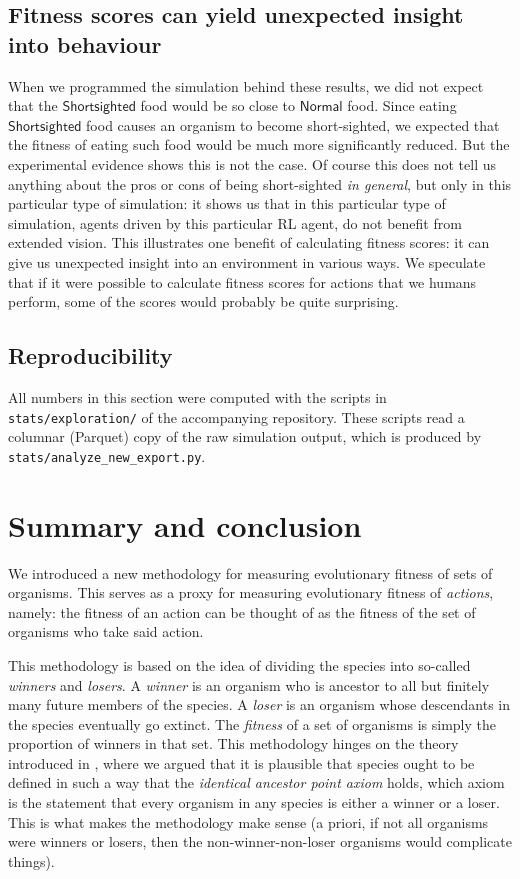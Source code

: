 \documentclass{article}
\begin{document}
\subsection{Fitness scores can yield unexpected insight into behaviour}

When we programmed the simulation behind these results, we did not expect
that the $\mathsf{Shortsighted}$ food would be so close to $\mathsf{Normal}$ food.
Since eating $\mathsf{Shortsighted}$ food causes an organism to
become short-sighted,
we expected that the fitness of eating such food would be much more significantly
reduced. But the experimental evidence shows this is not the case.
Of course this does not tell us anything about the pros or cons of being
short-sighted \emph{in general}, but only in this particular type of simulation:
it shows us that in this particular type of simulation, agents driven by this
particular RL agent, do not benefit from extended vision.
This
illustrates one benefit of calculating fitness scores: it can give us unexpected
insight into an environment in various ways. We speculate that if it were
possible to calculate fitness scores for actions that we humans perform,
some of the scores would probably be quite surprising.

\subsection{Reproducibility}

All numbers in this section were computed with the scripts in
\texttt{stats/exploration/} of the accompanying repository. These scripts read
a columnar (Parquet) copy of the raw simulation output, which is produced by
\texttt{stats/analyze\_new\_export.py}.

\section{Summary and conclusion}
\label{summarysecn}

We introduced a new methodology for measuring evolutionary fitness of
sets of organisms. This serves as a proxy for measuring evolutionary
fitness of \emph{actions}, namely: the fitness of an action can be
thought of as the fitness of the set of organisms who take said action.

This methodology is based on the idea of dividing the species into
so-called \emph{winners} and \emph{losers}. A \emph{winner} is an
organism who is ancestor to all but finitely many future members of the species.
A \emph{loser} is an organism whose descendants in the species
eventually go extinct.
The \emph{fitness} of a set of organisms is simply the proportion of winners
in that set.
This methodology hinges on the theory introduced
in \cite{alexander2026specieslike}, where we argued
that it is plausible that species ought to be defined in such a way that
the \emph{identical ancestor point axiom} holds, which axiom is the statement
that every organism in any species is either a winner or a loser.
This is what makes the methodology make sense (a priori, if not all organisms
were winners or losers, then the non-winner-non-loser organisms would complicate
things).
\end{document}
